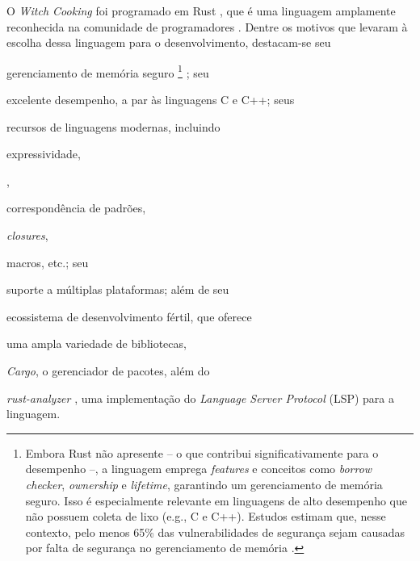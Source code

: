 \documentclass
  [11pt,a4paper,english,brazil,openright,sumario=tradicional,twoside]
  {abntex2}
\newcommand{\witchcooking}{\textit{Witch Cooking}\xspace}
\begin{document}
  O \witchcooking foi programado em Rust \cite{rust-2023-rust}, que é uma
  linguagem amplamente reconhecida na comunidade de programadores
  \cite{stack-overflow-2023-stack}. Dentre os motivos que levaram à escolha
  dessa linguagem para o desenvolvimento, destacam-se seu
  \begin{inparaenum}
    \item gerenciamento de memória seguro%
          \footnote
            { Embora Rust não apresente \textit{} --
              o que contribui significativamente para o desempenho --, a
              linguagem emprega \textit{features} e conceitos como
              \textit{borrow checker}, \textit{ownership} e \textit{lifetime},
              garantindo um gerenciamento de memória seguro. Isso é
              especialmente relevante em linguagens de alto desempenho que não
              possuem coleta de lixo (e.g., C e C++). Estudos estimam que,
              nesse contexto, pelo menos 65\% das vulnerabilidades de segurança
              sejam causadas por falta de segurança no gerenciamento de memória
              \cite{gaynor-2020-what}.}
          \cite[3]{nsa-2022-software}; seu
    \item excelente desempenho, a par às linguagens C e C++; seus
    \item recursos de linguagens modernas, incluindo
          \begin{inparaenum}
            \item expressividade,
            \item \textit{},
            \item correspondência de padrões,
            \item \textit{closures},
            \item macros, etc.; seu
          \end{inparaenum}
    \item suporte a múltiplas plataformas; além de seu
    \item ecossistema de desenvolvimento fértil, que oferece
          \begin{inparaenum}
            \item uma ampla variedade de bibliotecas,
            \item \textit{Cargo}, o gerenciador de pacotes, além do
            \item \textit{rust-analyzer} \cite{rust-analyzer-2023-rust}, uma
                  implementação do \textit{Language Server Protocol} (LSP) para
                  a linguagem.
          \end{inparaenum}
  \end{inparaenum}
\end{document}
